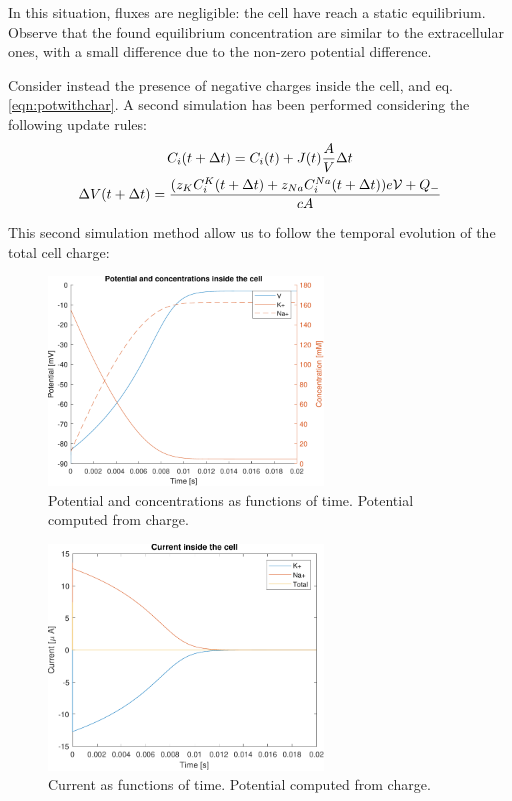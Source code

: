 \documentclass[11pt,a4 paper]{article}
\let\oldfrac\frac
\renewcommand{\frac}[3][d]{\ifthenelse{\equal{#1}{d}}{\oldfrac{#2}{#3}}{\nicefrac{#2}{#3}}}
\begin{document}
In this situation, fluxes are negligible: the cell have reach a static equilibrium. Observe that the found equilibrium concentration are similar to the extracellular ones, with a small difference due to the non-zero potential difference. 

\bigskip
Consider instead the presence of negative charges inside the cell, and eq. \eqref{eqn:potwithchar}. A second simulation has been performed considering the following update rules:
\begin{gather*}
    C_i(t+\Delta t) = C_i(t) + J(t) \frac{A}{V} \Delta t \\
    \Delta V(t+\Delta t) =  \frac{(z_KC_i^K(t+\Delta t) + z_{Na}C_i^{Na}(t+\Delta t))e\mathcal{V} + Q_-}{cA}
\end{gather*}

This second simulation method allow us to follow the temporal evolution of the total cell charge:

\begin{figure}[H]
    \centering
    \includegraphics[width=0.65\textwidth]{potential_chargepot.pdf}
    \caption{Potential and concentrations as functions of time. Potential computed from charge.}
    \label{fig:potential_chargepot}
\end{figure}

\begin{figure}[H]
    \centering
    \includegraphics[width=0.65\textwidth]{current_chargepot.pdf}
    \caption{Current as functions of time. Potential computed from charge.}
    \label{fig:current_chargepot}
\end{figure}
\end{document}
